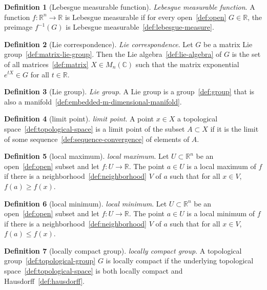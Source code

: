 \documentclass[12pt,a4paper]{article}
\theoremstyle{definition}
\newtheorem{definition}{Definition}
\begin{document}
\begin{definition}[Lebesgue measurable function]\label{def:lebesgue-measurable-function}
\emph{Lebesgue measurable function}. A function $f: \mathbb R^n \to \mathbb R$ is Lebesgue measurable if for every open~\ref{def:open} $G \in \mathbb R$, the preimage $f^{-1}(G)$ is Lebesgue measurable~\ref{def:lebesgue-measure}.
\end{definition}

\begin{definition}[Lie correspondence]\label{def:lie-correspondence}
\emph{Lie correspondence}. Let $G$ be a matrix Lie group~\ref{def:matrix-lie-group}. Then the Lie algebra~\ref{def:lie-algebra} of $G$ is the set of all matrices~\ref{def:matrix} $X \in M_n(\mathbb C)$ such that the matrix exponential $e^{tX} \in G$ for all $t \in \mathbb R$.
\end{definition}

\begin{definition}[Lie group]\label{def:lie-group}
\emph{Lie group}. A Lie group is a group~\ref{def:group} that is also a manifold~\ref{def:embedded-m-dimensional-manifold}.
\end{definition}

\begin{definition}[limit point]\label{def:limit-point}
\emph{limit point}. A point $x \in X$ a topological space~\ref{def:topological-space} is a limit point of the subset $A\subset X$ if it is the limit of some sequence~\ref{def:sequence-convergence} of elements of $A$.
\end{definition}

\begin{definition}[local maximum]\label{def:local-maximum}
\emph{local maximum}. Let $U\subset\mathbb R^n$ be an open~\ref{def:open} subset and let $f:U\to\mathbb R$. The point $a \in U$ is a local maximum of $f$  if there is a neighborhood~\ref{def:neighborhood} $V$ of $a$ such that for all $x \in V$, $f(a)\geq f(x)$.
\end{definition}

\begin{definition}[local minimum]\label{def:local-minimum}
\emph{local minimum}. Let $U\subset\mathbb R^n$ be an open~\ref{def:open} subset and let $f:U\to\mathbb R$. The point $a \in U$ is a local minimum of $f$  if there is a neighborhood~\ref{def:neighborhood} $V$ of $a$ such that for all $x \in V$, $f(a)\leq f(x)$.
\end{definition}

\begin{definition}[locally compact group]\label{def:locally-compact-group}
\emph{locally compact group}. A topological group~\ref{def:topological-group} $G$ is locally compact if the underlying topological space~\ref{def:topological-space} is both locally compact and Hausdorff~\ref{def:hausdorff}.
\end{definition}
\end{document}
